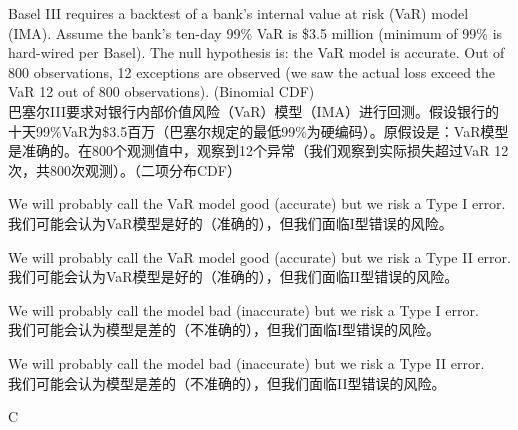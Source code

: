 \documentclass{article}
\newcounter{question} %
\begin{document}
\begin{question}
    Basel III requires a backtest of a bank's internal value at risk (VaR) model (IMA). Assume the bank's ten-day 99\% VaR is \$3.5 million (minimum of 99\% is hard-wired per Basel). The null hypothesis is: the VaR model is accurate. Out of 800 observations, 12 exceptions are observed (we saw the actual loss exceed the VaR 12 out of 800 observations). (Binomial CDF)
    \\巴塞尔III要求对银行内部价值风险（VaR）模型（IMA）进行回测。假设银行的十天99\%VaR为\$3.5百万（巴塞尔规定的最低99\%为硬编码）。原假设是：VaR模型是准确的。在800个观测值中，观察到12个异常（我们观察到实际损失超过VaR 12次，共800次观测）。（二项分布CDF）
\end{question}

\begin{choices}
    \item We will probably call the VaR model good (accurate) but we risk a Type I error.\\
        我们可能会认为VaR模型是好的（准确的），但我们面临I型错误的风险。
    \item We will probably call the VaR model good (accurate) but we risk a Type II error.\\
        我们可能会认为VaR模型是好的（准确的），但我们面临II型错误的风险。
    \item We will probably call the model bad (inaccurate) but we risk a Type I error.\\
        我们可能会认为模型是差的（不准确的），但我们面临I型错误的风险。
    \item We will probably call the model bad (inaccurate) but we risk a Type II error.\\
        我们可能会认为模型是差的（不准确的），但我们面临II型错误的风险。
\end{choices}

\begin{correctanswer}
    C
\end{correctanswer}
\end{document}
